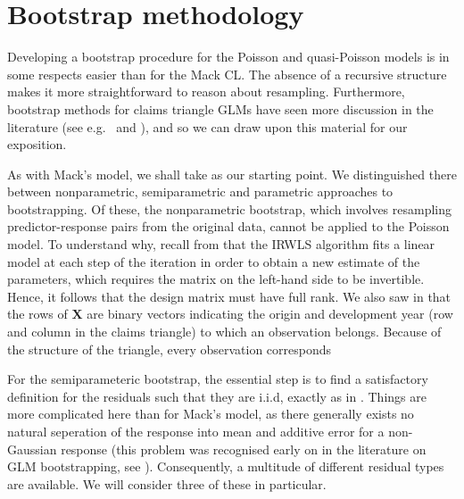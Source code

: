 \documentclass[a4paper]{book}
\begin{document}
\section{Bootstrap methodology}

Developing a bootstrap procedure for the Poisson and quasi-Poisson models is in some respects easier than for the Mack CL. The absence of a recursive structure makes it more straightforward to reason about resampling. Furthermore, bootstrap methods for claims triangle GLMs have seen more discussion in the literature (see e.g.\ \cite{pinheiro} and \cite{england:dist}), and so we can draw upon this material for our exposition. 

As with Mack's model, we shall take  as our starting point. We distinguished there between nonparametric, semiparametric and parametric approaches to bootstrapping. Of these, the nonparametric bootstrap, which involves resampling predictor-response pairs from the original data, cannot be applied to the Poisson model. To understand why, recall from  that the IRWLS algorithm fits a linear model at each step of the iteration in order to obtain a new estimate of the parameters, which requires the matrix on the left-hand side to be invertible. Hence, it follows that the design matrix must have full rank. We also saw in  that the rows of $\mathbf{X}$ are binary vectors indicating the origin and development year (row and column in the claims triangle) to which an observation belongs. Because of the structure of the triangle, every observation corresponds

For the semiparameteric bootstrap, the essential step is to find a satisfactory definition for the residuals such that they are i.i.d, exactly as in . Things are more complicated here than for Mack's model, as there generally exists no natural seperation of the response into mean and additive error for a non-Gaussian response (this problem was recognised early on in the literature on GLM bootstrapping, see \cite{moulton}). Consequently, a multitude of different residual types are available. We will consider three of these in particular.
\end{document}

